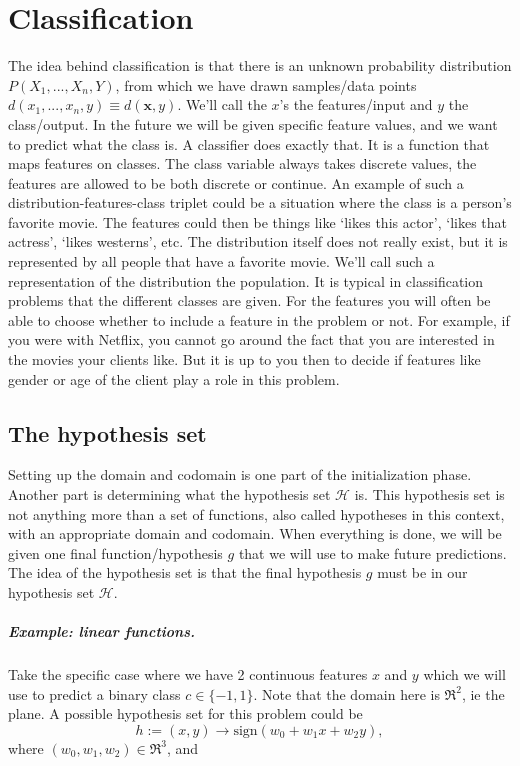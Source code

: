 \documentclass{report}
\theoremstyle{definition}
\begin{document}
	\chapter{Classification} \label{chap:classification}
The idea behind classification is that there is an unknown probability distribution $P(X_1,...,X_n,Y)$, from which we have drawn samples/data points $d(x_1,...,x_n,y)\equiv d(\bm{x},y)$. We'll call the $x$'s the features/input and $y$ the class/output. In the future we will be given specific feature values, and we want to predict what the class is. A classifier does exactly that. It is a function that maps features on classes. The class variable always takes discrete values, the features are allowed to be both discrete or continue. An example of such a distribution-features-class triplet could be a situation where the class is a person's favorite movie. The features could then be things like \lq likes this actor', \lq likes that actress', \lq likes westerns', etc. The distribution itself does not really exist, but it is represented by all people that have a favorite movie. We'll call such a representation of the distribution the population. It is typical in classification problems that the different classes are given. For the features you will often be able to choose whether to include a feature in the problem or not. For example, if you were with Netflix, you cannot go around the fact that you are interested in the movies your clients like. But it is up to you then to decide if features like gender or age of the client play a role in this problem. 
		
	\section{The hypothesis set}
Setting up the domain and codomain is one part of the initialization phase. Another part is determining what the hypothesis set $\mathcal{H}$ is. This hypothesis set is not anything more than a set of functions, also called hypotheses in this context,  with an appropriate domain and codomain. When everything is done, we will be given one final function/hypothesis $g$ that we will use to make future predictions. The idea of the hypothesis set is that the final hypothesis $g$ must be in our hypothesis set $\mathcal{H}$.
\paragraph{Example: linear functions.}
Take the specific case where we have 2 continuous features $x$ and $y$ which we will use to predict a binary class $c \in \{-1,1\}$. Note that the domain here is $\Re^2$, ie the plane. A possible hypothesis set for this problem could be
\begin{equation}
h:= (x,y) \rightarrow \text{sign}(w_0 + w_1 x + w_2 y),
\end{equation}
where $(w_0,w_1,w_2) \in \Re^3$, and
\end{document}
